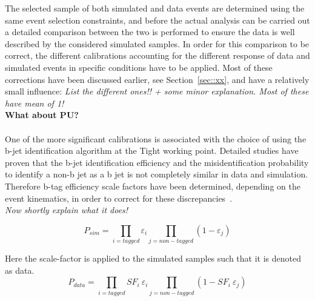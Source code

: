 The selected sample of both simulated and data events are determined using the same event selection constraints, and before the actual analysis can be carried out a detailed comparison between the two is performed to ensure the data is well described by the considered simulated samples.
In order for this comparison to be correct, the different calibrations accounting for the different response of data and simulated events in specific conditions have to be applied.
Most of these corrections have been discussed earlier, see Section~\ref{sec::xx}, and have a relatively small influence: \textit{List the different ones!! + some minor explanation. Most of these have mean of 1!}
\\
\textbf{What about PU?}
\\
\\
One of the more significant calibrations is associated with the choice of using the b-jet identification algorithm at the Tight working point. 
Detailed studies have proven that the b-jet identification efficiency and the misidentification probability to identify a non-b jet as a b jet is not completely similar in data and simulation. 
Therefore b-tag efficiency scale factors have been determined, depending on the event kinematics, in order to correct for these discrepancies~\cite{BTagSF}.
\\
\textit{Now shortly explain what it does!}

\begin{equation}
 P_{sim} = \prod_{i = tagged} \varepsilon_{i} \prod_{j = non-tagged} (1-\varepsilon_{j})
\end{equation}

Here the scale-factor is applied to the simulated samples such that it is denoted as data.
\begin{equation}
 P_{data} = \prod_{i = tagged} SF_{i} ~ \varepsilon_{i} \prod_{j = non-tagged} (1- SF_{i} ~ \varepsilon_{j})
\end{equation}

